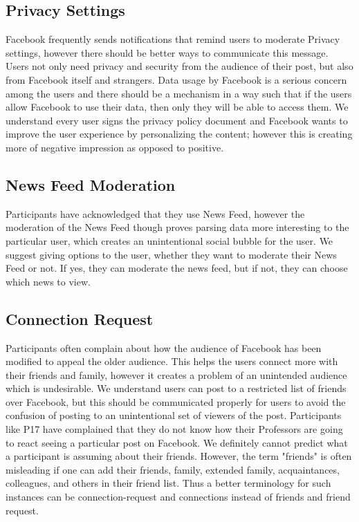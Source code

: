 \subsection{Privacy Settings}
Facebook frequently sends notifications that remind users to moderate Privacy settings, however there should be better ways to communicate this message. Users not only need privacy and security from the audience of their post, but also from Facebook itself and strangers. Data usage by Facebook is a serious concern among the users and there should be a mechanism in a way such that if the users allow Facebook to use their data, then only they will be able to access them. We understand every user signs the privacy policy document and Facebook wants to improve the user experience by personalizing the content; however this is creating more of negative impression as opposed to positive.
\subsection{News Feed Moderation}
Participants have acknowledged that they use News Feed, however the moderation of the News Feed though proves parsing data more interesting to the particular user, which creates an unintentional social bubble for the user. We suggest giving options to the user, whether they want to moderate their News Feed or not. If yes, they can moderate the news feed, but if not, they can choose which news to view.
\subsection{Connection Request}
Participants often complain about how the audience of Facebook has been modified to appeal the older audience. This helps the users connect more with their friends and family, however it creates a problem of an unintended audience which is undesirable. We understand users can post to a restricted list of friends over Facebook, but this should be communicated properly for users to avoid the confusion of posting to an unintentional set of viewers of the post. Participants like P17 have complained that they do not know how their Professors are going to react seeing a particular post on Facebook. We definitely cannot predict what a participant is assuming about their friends. However, the term "friends" is often misleading if one can add their friends, family, extended family, acquaintances, colleagues, and others in their friend list. Thus a better terminology for such instances can be connection-request and connections instead of friends and friend request.
